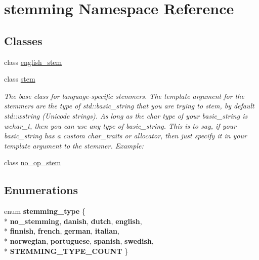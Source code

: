 \hypertarget{namespacestemming}{\section{stemming Namespace Reference}
\label{namespacestemming}
}
\subsection*{Classes}
\begin{DoxyCompactItemize}
\item 
class \hyperlink{classstemming_1_1english__stem}{english\-\_\-stem}
\item 
class \hyperlink{classstemming_1_1stem}{stem}
\begin{DoxyCompactList}\small\item\em The base class for language-\/specific stemmers. The template argument for the stemmers are the type of std\-::basic\-\_\-string that you are trying to stem, by default std\-::wstring (Unicode strings). As long as the char type of your basic\-\_\-string is wchar\-\_\-t, then you can use any type of basic\-\_\-string. This is to say, if your basic\-\_\-string has a custom char\-\_\-traits or allocator, then just specify it in your template argument to the stemmer. Example\-: \end{DoxyCompactList}\item 
class \hyperlink{classstemming_1_1no__op__stem}{no\-\_\-op\-\_\-stem}
\end{DoxyCompactItemize}
\subsection*{Enumerations}
\begin{DoxyCompactItemize}
\item 
enum {\bfseries stemming\-\_\-type} \{ \\*
{\bfseries no\-\_\-stemming}, 
{\bfseries danish}, 
{\bfseries dutch}, 
{\bfseries english}, 
\\*
{\bfseries finnish}, 
{\bfseries french}, 
{\bfseries german}, 
{\bfseries italian}, 
\\*
{\bfseries norwegian}, 
{\bfseries portuguese}, 
{\bfseries spanish}, 
{\bfseries swedish}, 
\\*
{\bfseries S\-T\-E\-M\-M\-I\-N\-G\-\_\-\-T\-Y\-P\-E\-\_\-\-C\-O\-U\-N\-T}
 \}
\end{DoxyCompactItemize}
